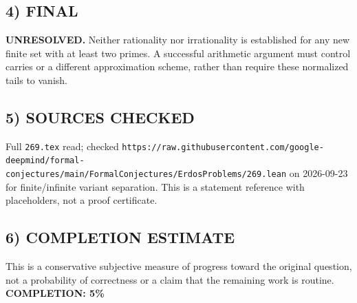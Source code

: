 \subsection{4) FINAL}
\textbf{UNRESOLVED.}
Neither rationality nor irrationality is established for any new finite set with at least two primes. A successful arithmetic argument must control carries or a different approximation scheme, rather than require these normalized tails to vanish.
\subsection{5) SOURCES CHECKED}
Full \texttt{269.tex} read; checked \texttt{https://raw.githubusercontent.com/google-deepmind/formal-conjectures/main/FormalConjectures/ErdosProblems/269.lean} on 2026-09-23 for finite/infinite variant separation. This is a statement reference with placeholders, not a proof certificate.
\subsection{6) COMPLETION ESTIMATE}
This is a conservative subjective measure of progress toward the original question, not a probability of correctness or a claim that the remaining work is routine.
\textbf{COMPLETION: 5\%}

